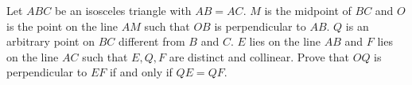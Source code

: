 Let $ ABC$ be an isosceles triangle with $ AB = AC$. $ M$ is the midpoint of $ BC$ and $ O$ is the point on the line $ AM$ such that $ OB$ is perpendicular to $ AB$. $ Q$ is an arbitrary point on $ BC$ different from $ B$ and $ C$. $ E$ lies on the line $ AB$ and $ F$ lies on the line $ AC$ such that $ E, Q, F$ are distinct and collinear. Prove that $ OQ$ is perpendicular to $ EF$ if and only if $ QE = QF$.
